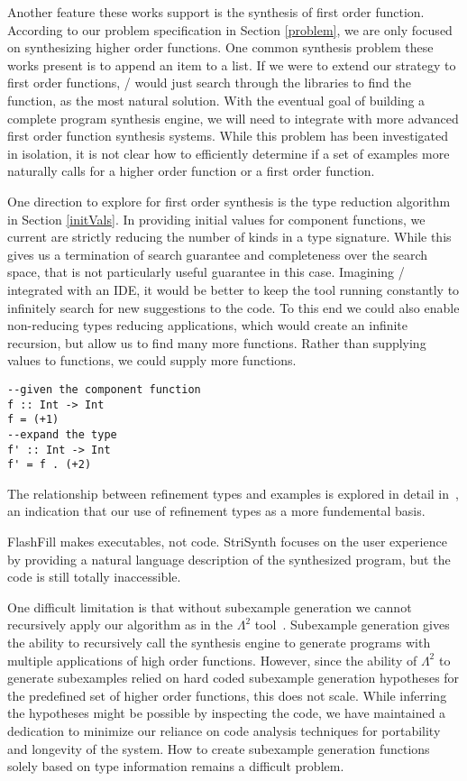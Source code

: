 Another feature these works support is the synthesis of first order function.
According to our problem specification in Section \ref{problem}, we are only focused on synthesizing higher order functions. 
One common synthesis problem these works present is to append an item to a list.
If we were to extend our strategy to first order functions, \ourTool/ would just search through the libraries to find the  function, as the most natural solution. 
With the eventual goal of building a complete program synthesis engine, we will need to integrate with more advanced first order function synthesis systems.
While this problem has been investigated in isolation, it is not clear how to efficiently determine if a set of examples more naturally calls for a higher order function or a first order function.

One direction to explore for first order synthesis is the type reduction algorithm in Section \ref{initVals}.
In providing initial values for component functions, we current are strictly reducing the number of kinds in a type signature.
While this gives us a termination of search guarantee and completeness over the search space, that is not particularly useful guarantee in this case.
Imagining \ourTool/ integrated with an IDE, it would be better to keep the tool running constantly to infinitely search for new suggestions to the code.
To this end we could also enable non-reducing types reducing applications, which would create an infinite recursion, but allow us to find many more functions.
Rather than supplying values to functions, we could supply more functions.

\begin{lstlisting}
--given the component function
f :: Int -> Int
f = (+1)
--expand the type
f' :: Int -> Int
f' = f . (+2)

\end{lstlisting} 

The relationship between refinement types and examples is explored in detail in~\cite{Osera:2016}, an indication that our use of refinement types as a more fundemental basis.

FlashFill makes executables, not code. StriSynth focuses on the user experience by providing a natural language description of the synthesized program, but the code is still totally inaccessible. 

One difficult limitation is that without subexample generation we cannot recursively apply our algorithm as in the $\Lambda^2$ tool~\cite{Feser:2015}.
Subexample generation gives the ability to recursively call the synthesis engine to generate programs with multiple applications of high order functions.
However, since the ability of $\Lambda^2$ to generate subexamples relied on hard coded subexample generation hypotheses for the predefined set of higher order functions, this does not scale.
While inferring the hypotheses might be possible by inspecting the code, we have maintained a dedication to minimize our reliance on code analysis techniques for portability and longevity of the system. 
How to create subexample generation functions solely based on type information remains a difficult problem.
